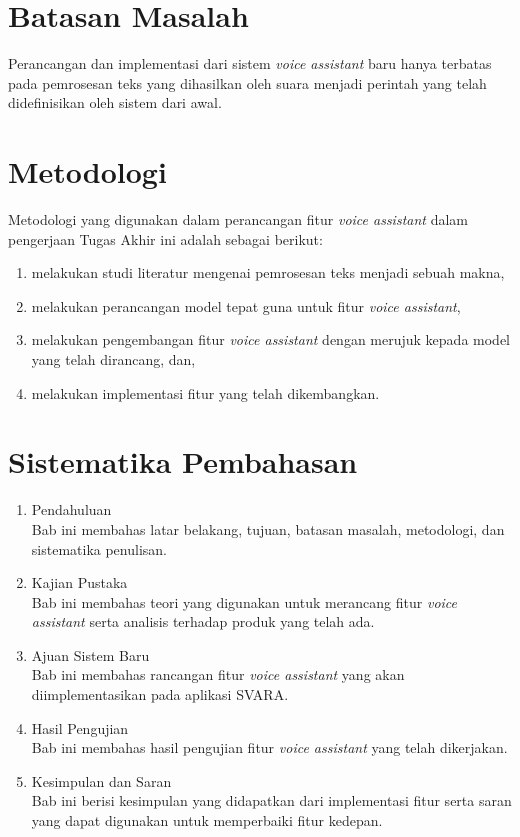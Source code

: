 \section{Batasan Masalah}

Perancangan dan implementasi dari sistem \textit{voice assistant} baru hanya terbatas pada pemrosesan teks yang dihasilkan oleh suara menjadi perintah yang telah didefinisikan oleh sistem dari awal.

\section{Metodologi}

Metodologi yang digunakan dalam perancangan fitur \textit{voice assistant} dalam pengerjaan Tugas Akhir ini adalah sebagai berikut:

\begin{enumerate}
	\item melakukan studi literatur mengenai pemrosesan teks menjadi sebuah makna,
	\item melakukan perancangan model tepat guna untuk fitur \textit{voice assistant},
	\item melakukan pengembangan fitur \textit{voice assistant} dengan merujuk kepada model yang telah dirancang, dan,
	\item melakukan implementasi fitur yang telah dikembangkan. 
\end{enumerate}

\section{Sistematika Pembahasan}

\begin{enumerate}[label=Bab \arabic*,itemindent=*]
	\item Pendahuluan\\
	Bab ini membahas latar belakang, tujuan, batasan masalah, metodologi, dan sistematika penulisan.
	\item Kajian Pustaka\\
	Bab ini membahas teori yang digunakan untuk merancang fitur \textit{voice assistant} serta analisis terhadap produk yang telah ada.
	\item Ajuan Sistem Baru\\
	Bab ini membahas rancangan fitur \textit{voice assistant} yang akan diimplementasikan pada aplikasi SVARA.
	\item Hasil Pengujian\\
	Bab ini membahas hasil pengujian fitur \textit{voice assistant} yang telah dikerjakan.
	\item Kesimpulan dan Saran\\
	Bab ini berisi kesimpulan yang didapatkan dari implementasi fitur serta saran yang dapat digunakan untuk memperbaiki fitur kedepan.
\end{enumerate}
